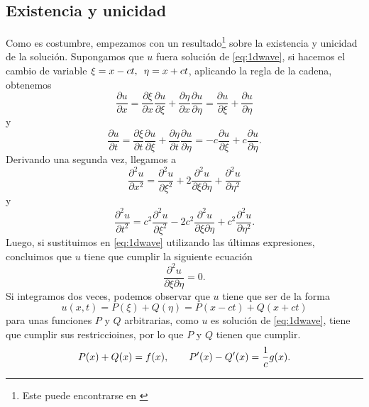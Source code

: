\subsection{Existencia y unicidad}
Como es costumbre, empezamos con un resultado\footnote{Este puede encontrarse en \cite{1dwavedem}} sobre la existencia y unicidad de la solución. Supongamos que $u$ fuera solución de \eqref{eq:1dwave}, si hacemos el cambio de variable $\xi = x-ct, \hspace{5px} \eta = x+ct$, aplicando la regla de la cadena, obtenemos
\begin{equation}
	\frac{\partial u}{\partial x} = \frac{\partial\xi}{\partial x}\frac{\partial u}{\partial\xi} + \frac{\partial\eta}{\partial x}\frac{\partial u}{\partial\eta} = \frac{\partial u}{\partial\xi} + \frac{\partial u}{\partial\eta}
\end{equation}
y
\begin{equation}
	\frac{\partial u}{\partial t} = \frac{\partial\xi}{\partial t}\frac{\partial u}{\partial\xi} + \frac{\partial\eta}{\partial t}\frac{\partial u}{\partial\eta} = -c\frac{\partial u}{\partial\xi} +c \frac{\partial u}{\partial\eta}.
\end{equation}
Derivando una segunda vez, llegamos a
\begin{equation}
	\frac{\partial^2u}{\partial x^2} = \frac{\partial^2u}{\partial \xi^2}+2\frac{\partial^2u}{\partial\xi\partial\eta}+\frac{\partial^2u}{\partial\eta^2}
\end{equation}
y
\begin{equation}
	\frac{\partial^2u}{\partial t^2} = c^2\frac{\partial^2u}{\partial \xi^2}-2c^2\frac{\partial^2u}{\partial\xi\partial\eta}+c^2\frac{\partial^2u}{\partial\eta^2}.
\end{equation}
Luego, si sustituimos en \eqref{eq:1dwave} utilizando las últimas expresiones, concluimos que $u$ tiene que cumplir la siguiente ecuación
\begin{equation}
	\frac{\partial^2 u}{\partial\xi\partial\eta} = 0.
\end{equation}
Si integramos dos veces, podemos observar que $u$ tiene que ser de la forma
\begin{equation}
	\label{eq:1dwave2}
	u(x,t) = P(\xi) + Q(\eta) = P(x-ct) + Q(x+ct)
\end{equation}
para unas funciones $P$ y $Q$ arbitrarias, como $u$ es solución de \eqref{eq:1dwave}, tiene que cumplir sus restriccioines, por lo que $P$ y $Q$ tienen que cumplir.
\begin{equation}
	P(x) + Q(x) = f(x), \hspace{20px} P'(x) - Q'(x) = \frac{1}{c}g(x). 
\end{equation}
